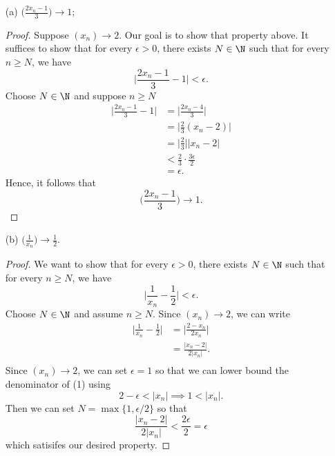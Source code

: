 \begin{enumerate}
    \item[(a)] \(  \Big(\frac{2x_n - 1}{ 3} \Big) \to 1\);
        \begin{proof}
            Suppose \( (x_n) \to 2\). Our goal is to show that property above. It suffices to show that for every \( \epsilon  > 0\), there exists \( N \in \N  \) such that for every  \( n \geq N  \), we have 
            \[ \Big| \frac{2x_n - 1}{3} - 1 \Big| < \epsilon. \]
        Choose \( N \in \N \) and suppose \( n \geq N \)
        \begin{align*}
        \Big| \frac{2x_n  - 1}{3} - 1 \Big| &= \Big| \frac{2x_n - 4}{3}  \Big| \\
                                    &= \Big| \frac{2}{3} (x_n - 2)\Big| \\
                                    &= \Big| \frac{2}{3} \Big| | x_n - 2 | \\ 
                                    &< \frac{2}{3} \cdot \frac{3 \epsilon }{2} \\
                                    &= \epsilon.
        \end{align*}
        Hence, it follows that 
        \[ \Big(  \frac{2x_n  - 1}{3}\Big) \to 1.\]
        \end{proof}
    \item[(b)] \( \Big(   \frac{1}{x_n}\Big) \to \frac{1}{2}\).
        \begin{proof}
        We want to show that for every \( \epsilon  > 0 \), there exists \( N \in \N \) such that for every \( n \geq N \), we have 
        \[ \Big| \frac{1}{x_n} - \frac{1}{2}\Big| < \epsilon.\]
        Choose \( N \in \N \) and assume \( n \geq N \). Since \( (x_n) \to 2\), we can write 
        \begin{align*}
        \Big| \frac{1}{x_n} - \frac{1}{2} \Big| &= \Big| \frac{2 - x_n}{2x_n} \Big| \\
                                                &= \frac{ | x_n - 2 |}{ 2|x_n |}. \tag{1} \\
        \end{align*}
        Since \( (x_n) \to 2\), we can set \( \epsilon  = 1\) so that we can lower bound the denominator of (1) using 
        \[ 2 - \epsilon < | x_n | \implies 1 < | x_n |. \]
        Then we can set \( N = \max \{ 1, \epsilon / 2 \}\) so that 
        \[ \frac{ | x_n - 2  |}{ 2| x_n |} < \frac{2 \epsilon }{2} = \epsilon \]
        which satisifes our desired property.
        \end{proof}

\end{enumerate}


